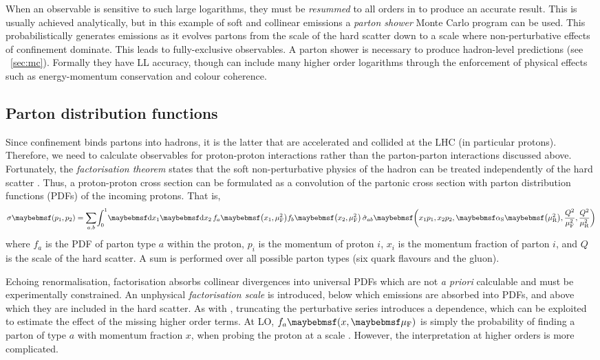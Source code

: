 When an observable is sensitive to such large logarithms, they must be \textit{resummed} 
to all orders in \alphaS to produce an accurate result. This is usually achieved 
analytically, but in this example of soft and collinear emissions a \textit{parton 
shower} Monte Carlo program can be used. This probabilistically generates emissions as it 
evolves partons from the scale of the hard scatter down to a scale where non-perturbative 
effects of confinement dominate. This leads to fully-exclusive observables. A parton 
shower is necessary to produce hadron-level predictions (see \Section~\ref{sec:mc}). 
Formally they have LL accuracy, though can include many higher order logarithms 
through the enforcement of physical effects such as energy-momentum conservation and colour 
coherence.



\subsection{Parton distribution functions}
\label{sec:qcd:pdf}

Since confinement binds partons into hadrons, it is the latter that are accelerated and 
collided at the LHC (in particular protons). Therefore, we need to calculate 
observables for proton-proton interactions rather than the parton-parton interactions 
discussed above. Fortunately, the \textit{factorisation theorem} states that the soft 
non-perturbative physics of the hadron can be treated independently of the hard scatter 
\cite{Collins:1982}. Thus, a proton-proton cross section can be formulated as a 
convolution of the partonic cross section with parton distribution functions (PDFs) of 
the incoming protons. That is,
\begin{equation}
	\sigma\parenths{p_1, p_2} = 
	\sum\limits_{a, b} \! \int_0^1 \! \d{x_1} \d{x_2} \,
	f_a \parenths{x_1, \mu_{\text{F}}^2} f_b \parenths{x_2, \mu_{\text{F}}^2} \,
	\hat{\sigma}_{ab} \parenths{x_1 p_1, x_2 p_2, \alphaS\parenths{\mu_{\text{R}}^2}, 
	\frac{Q^2}{\mu_{\text{F}}^2}, \frac{Q^2}{\mu_{\text{R}}^2}} 
\end{equation}
where $f_a$ is the PDF of parton type $a$ within the proton, $p_i$ is the momentum 
of proton $i$, $x_i$ is the momentum fraction of parton $i$, and $Q$ is the scale of the 
hard scatter. A sum is performed over all possible parton types (six quark flavours and 
the gluon).

Echoing renormalisation, factorisation absorbs collinear divergences into universal 
PDFs which are not \textit{a priori} calculable and must be experimentally 
constrained. An unphysical \textit{factorisation scale} \muf is introduced, 
below which emissions are absorbed into PDFs, and above which they are included in 
the hard scatter. As with \mur, truncating the perturbative series introduces a 
\muf dependence, which can be exploited to estimate the effect of the missing higher 
order terms. At LO, $f_a \parenths{x, \muf}$ is simply the probability of finding a 
parton of type $a$ with momentum fraction $x$, when probing the proton at a scale \muf.
However, the interpretation at higher orders is more complicated.

